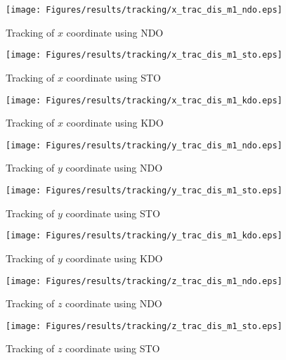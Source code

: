 \documentclass{article}
\begin{document}
\begin{figure}[H]
\centering
\texttt{[image: Figures/results/tracking/x\_trac\_dis\_m1\_ndo.eps]}
\caption{Tracking of $x$ coordinate using NDO}
\label{x_trac_dis_m1_ndo}
\end{figure}

\begin{figure}[H]
\centering
\texttt{[image: Figures/results/tracking/x\_trac\_dis\_m1\_sto.eps]}
\caption{Tracking of $x$ coordinate using STO}
\label{x_trac_dis_m1_sto}
\end{figure}

\begin{figure}[H]
\centering
\texttt{[image: Figures/results/tracking/x\_trac\_dis\_m1\_kdo.eps]}
\caption{Tracking of $x$ coordinate using KDO}
\label{x_trac_dis_m1_kdo}
\end{figure}

\begin{figure}[H]
\centering
\texttt{[image: Figures/results/tracking/y\_trac\_dis\_m1\_ndo.eps]}
\caption{Tracking of $y$ coordinate using NDO}
\label{y_trac_dis_m1_ndo}
\end{figure}

\begin{figure}[H]
\centering
\texttt{[image: Figures/results/tracking/y\_trac\_dis\_m1\_sto.eps]}
\caption{Tracking of $y$ coordinate using STO}
\label{y_trac_dis_m1_sto}
\end{figure}

\begin{figure}[H]
\centering
\texttt{[image: Figures/results/tracking/y\_trac\_dis\_m1\_kdo.eps]}
\caption{Tracking of $y$ coordinate using KDO}
\label{y_trac_dis_m1_kdo}
\end{figure}

\begin{figure}[H]
\centering
\texttt{[image: Figures/results/tracking/z\_trac\_dis\_m1\_ndo.eps]}
\caption{Tracking of $z$ coordinate using NDO}
\label{z_trac_dis_m1_ndo}
\end{figure}

\begin{figure}[H]
\centering
\texttt{[image: Figures/results/tracking/z\_trac\_dis\_m1\_sto.eps]}
\caption{Tracking of $z$ coordinate using STO}
\label{z_trac_dis_m1_sto}
\end{figure}
\end{document}
